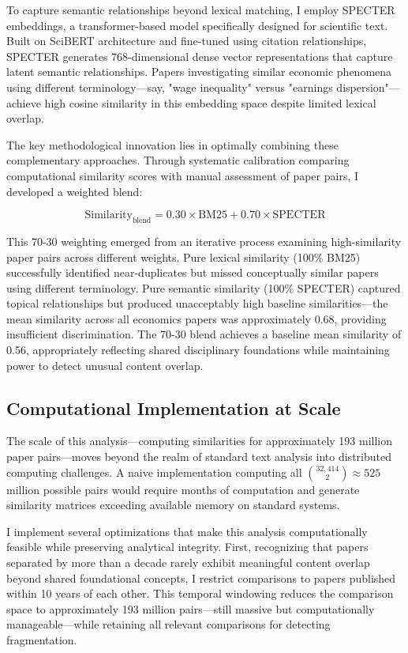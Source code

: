 \documentclass[12pt]{article}
\begin{document}
To capture semantic relationships beyond lexical matching, I employ SPECTER embeddings, a transformer-based model specifically designed for scientific text. Built on SciBERT architecture and fine-tuned using citation relationships, SPECTER generates 768-dimensional dense vector representations that capture latent semantic relationships. Papers investigating similar economic phenomena using different terminology—say, "wage inequality" versus "earnings dispersion"—achieve high cosine similarity in this embedding space despite limited lexical overlap.

The key methodological innovation lies in optimally combining these complementary approaches. Through systematic calibration comparing computational similarity scores with manual assessment of paper pairs, I developed a weighted blend:

\begin{equation}
\text{Similarity}_{\text{blend}} = 0.30 \times \text{BM25} + 0.70 \times \text{SPECTER}
\end{equation}

This 70-30 weighting emerged from an iterative process examining high-similarity paper pairs across different weights. Pure lexical similarity (100\% BM25) successfully identified near-duplicates but missed conceptually similar papers using different terminology. Pure semantic similarity (100\% SPECTER) captured topical relationships but produced unacceptably high baseline similarities—the mean similarity across all economics papers was approximately 0.68, providing insufficient discrimination. The 70-30 blend achieves a baseline mean similarity of 0.56, appropriately reflecting shared disciplinary foundations while maintaining power to detect unusual content overlap.

\subsection{Computational Implementation at Scale}

The scale of this analysis—computing similarities for approximately 193 million paper pairs—moves beyond the realm of standard text analysis into distributed computing challenges. A naive implementation computing all ${32,414 \choose 2} \approx 525$ million possible pairs would require months of computation and generate similarity matrices exceeding available memory on standard systems.

I implement several optimizations that make this analysis computationally feasible while preserving analytical integrity. First, recognizing that papers separated by more than a decade rarely exhibit meaningful content overlap beyond shared foundational concepts, I restrict comparisons to papers published within 10 years of each other. This temporal windowing reduces the comparison space to approximately 193 million pairs—still massive but computationally manageable—while retaining all relevant comparisons for detecting fragmentation.
\end{document}
